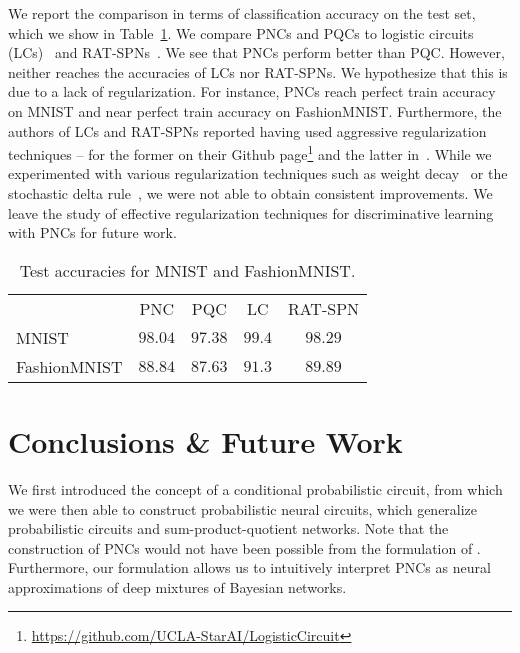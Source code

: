 \documentclass[letterpaper]{article} %
\begin{document}
We report the comparison in terms of classification accuracy on the test set, which we show in Table~\ref{tab:discrim}. We compare PNCs and PQCs to logistic circuits (LCs)~\citep{liang2019learning} and RAT-SPNs~. We see that PNCs perform better than PQC. However, neither reaches the accuracies of LCs nor RAT-SPNs. We hypothesize that this is due to a lack of regularization. For instance, PNCs reach perfect train accuracy on MNIST and near perfect train accuracy on FashionMNIST.
Furthermore, the authors of LCs and RAT-SPNs reported having used aggressive regularization techniques -- for the former on their Github page\footnote{\url{https://github.com/UCLA-StarAI/LogisticCircuit}} and the latter in~.
While we experimented with various regularization techniques such as weight decay~ or the stochastic delta rule~\citep{hanson1990stochastic}, we were not able to obtain consistent improvements. We leave the study of effective regularization techniques for discriminative learning with PNCs for future work.









\begin{table}[t]
	\footnotesize
	\centering
	\begin{tabular}{lcccc}
		             & PNC     & PQC     & LC     & RAT-SPN  \\
		\cmidrule(lr){2-3}
		\cmidrule(lr){4-5}
		MNIST        & $98.04$ & $97.38$ & $99.4$ & $98.29$  \\
		FashionMNIST & $88.84$ & $87.63$ & $91.3$ & $89.89 $ \\
	\end{tabular}
	\caption{Test accuracies for MNIST and FashionMNIST.}
	\label{tab:discrim}
\end{table}



\section{Conclusions \& Future Work}


We first introduced the concept of a conditional probabilistic circuit, from which we were then able to construct probabilistic neural circuits, which generalize probabilistic circuits and sum-product-quotient networks. Note that the construction of PNCs would not have been possible from the formulation of \citet{sharir2018sum}. Furthermore, our formulation allows us to intuitively interpret PNCs as neural approximations of deep mixtures of Bayesian networks.
\end{document}
